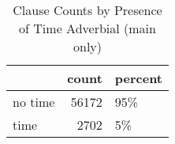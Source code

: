 \begin{table}[htbp!]
\centering
\caption{Clause Counts by Presence of Time Adverbial (main only)}
\label{table:main_cp}
\begin{tabular}{lrl}
\toprule
{} &  count & percent \\
\midrule
no time &  56172 &     95\% \\
time    &   2702 &      5\% \\
\bottomrule
\end{tabular}
\end{table}
